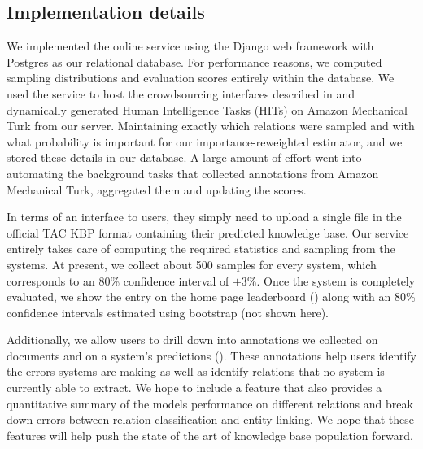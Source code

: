 \subsection{Implementation details}
We implemented the online service using the Django web framework with Postgres as our relational database.
For performance reasons, we computed sampling distributions and evaluation scores entirely within the database.
We used the service to host the crowdsourcing interfaces described in  and dynamically generated Human Intelligence Tasks (HITs) on Amazon Mechanical Turk from our server.
Maintaining exactly which relations were sampled and with what probability is important for our importance-reweighted estimator, and we stored these details in our database.
A large amount of effort went into automating the background tasks that collected annotations from Amazon Mechanical Turk, aggregated them and updating the scores.

In terms of an interface to users, they simply need to upload a single file in the official TAC KBP format containing their predicted knowledge base.
Our service entirely takes care of computing the required statistics and sampling from the systems.
At present, we collect about 500 samples for every system, which corresponds to an 80\% confidence interval of $\pm 3\%$.
Once the system is completely evaluated, we show the entry on the home page leaderboard () along with an 80\% confidence intervals estimated using bootstrap (not shown here).

Additionally, we allow users to drill down into annotations we collected on documents and on a system's predictions ().
These annotations help users identify the errors systems are making as well as identify relations that no system is currently able to extract.
We hope to include a feature that also provides a quantitative summary of the models performance on different relations and break down errors between relation classification and entity linking.
We hope that these features will help push the state of the art of knowledge base population forward.

